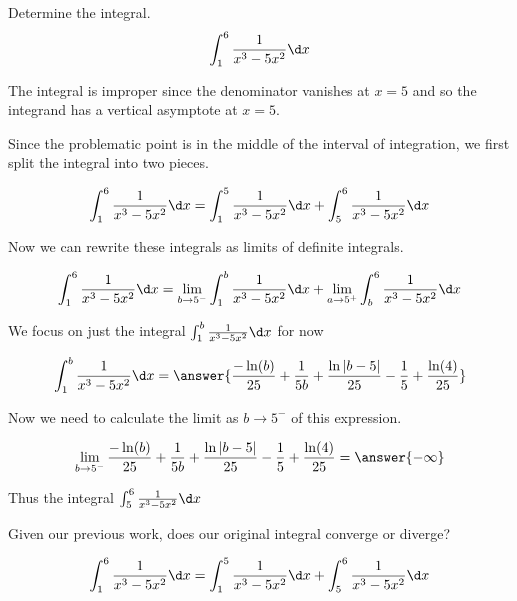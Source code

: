 \documentclass{ximera}
\author{Jason Miller}
\begin{document}
\begin{exercise}
Determine the integral.
\[
\int_{1}^{6} \frac{1}{x^{3}-5x^{2}} \d x
\]

The integral is improper since the denominator vanishes at $x=5$ and so the integrand has a vertical asymptote at $x=5$. 

Since the problematic point is in the middle of the interval of integration, we first split the integral into two pieces. 

\[
\int _{1}^{6} \frac{1}{x^{3}-5x^{2}} \d x=\int_{1}^{5} \frac{1}{x^{3}-5x^{2}} \d x + \int_{5}^{6} \frac{1}{x^{3}-5x^{2}} \d x
\]

Now we can rewrite these integrals as limits of definite integrals. 

\[
\int_{1}^{6} \frac{1}{x^{3}-5x^{2}} \d x= \lim_{b \to 5^{-}} \int_{1}^{b} \frac{1}{x^{3}-5x^{2}} \d x + \lim_{a \to 5^{+}} \int _{b}^{6} 
\frac{1}{x^{3}-5x^{2}} \d x
\]


We focus on just the integral $\int_{1}^{b} \frac{1}{x^{3}-5x^{2}} \d x$ for now

\[
\int_{1}^{b} \frac{1}{x^{3}-5x^{2}} \d x=\answer{  \frac{-\ln(b)}{25} +\frac{1}{5b} + \frac{\ln|b-5|}{25}-\frac{1}{5}+\frac{\ln(4)}{25}  }
\]


\begin{exercise}
Now we need to calculate the limit as $b \to 5^{-}$ of this expression. 

\[
\lim_{b \to 5^{-}}  \frac{-\ln(b)}{25} +\frac{1}{5b} + \frac{\ln|b-5|}{25}-\frac{1}{5}+\frac{\ln(4)}{25} =\answer{ -\infty}
\]

\begin{exercise}
Thus the integral $\int_{5}^{6} \frac{1}{x^{3}-5x^{2}} \d x$

\begin{multipleChoice}
\end{multipleChoice}

\begin{exercise}

Given our previous work, does our original integral converge or diverge?


\[
\int _{1}^{6} \frac{1}{x^{3}-5x^{2}} \d x=\int_{1}^{5} \frac{1}{x^{3}-5x^{2}} \d x + \int_{5}^{6} \frac{1}{x^{3}-5x^{2}} \d x
\]

\begin{multipleChoice}
\end{multipleChoice}


\end{exercise}


\end{exercise}
\end{exercise}
\end{exercise}
\end{document}
